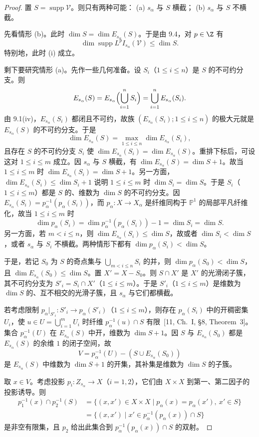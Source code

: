 \begin{proof}
置 $S=\operatorname{supp}\mathcal{V}$。则只有两种可能：
(a) $s_\alpha$ 与 $S$ 横截；
(b) $s_\alpha$ 与 $S$ 不横截。

先看情形 (b)。此时 $\dim S=\dim E_{s_\alpha}(S)$。于是由 9.4，对 $p\in\Z$ 有
$$\dim\operatorname{supp}L^pI_{s_\alpha}(\mathcal{V})\le\dim S.$$
特别地，此时 (i) 成立。

剩下要研究情形 (a)。先作一些几何准备。设 $S_i$（$1\le i\le n$）是 $S$ 的不可约分支。则
$$E_{s_\alpha}(S)=E_{s_\alpha}\Bigl(\bigcup_{i=1}^n S_i\Bigr)=\bigcup_{i=1}^n E_{s_\alpha}(S_i).$$
由 9.1(iv)，$E_{s_\alpha}(S_i)$ 都闭且不可约，故族 $(E_{s_\alpha}(S_i);1\le i\le n)$ 的极大元就是 $E_{s_\alpha}(S)$ 的不可约分支。于是
$$\dim E_{s_\alpha}(S)=\max_{1\le i\le n}\dim E_{s_\alpha}(S_i),$$
且存在 $S$ 的不可约分支 $S_i$ 使 $\dim E_{s_\alpha}(S_i)=\dim E_{s_\alpha}(S)$。重排下标后，可设这对 $1\le i\le m$ 成立。因 $s_\alpha$ 与 $S$ 横截，有 $\dim E_{s_\alpha}(S)=\dim S+1$。故当 $1\le i\le m$ 时 $\dim E_{s_\alpha}(S_i)=\dim S+1$。另一方面，$\dim E_{s_\alpha}(S_i)\le\dim S_i+1$ 说明 $1\le i\le m$ 时 $\dim S_i=\dim S$。于是 $S_i$（$1\le i\le m$）都是 $S$ 的、维数为 $\dim S$ 的不可约分支。因 $E_{s_\alpha}(S_i)=p_\alpha^{-1}(p_\alpha(S_i))$，而 $p_\alpha:X\to X_\alpha$ 是纤维同构于 $\mathbb{P}^1$ 的局部平凡纤维化，故当 $1\le i\le m$ 时
$$\dim p_\alpha(S_i)=\dim p_\alpha^{-1}(p_\alpha(S_i))-1=\dim S_i=\dim S.$$
另一方面，若 $m<i\le n$，则 $\dim E_{s_\alpha}(S_i)\le\dim S$，故或者 $\dim S_i<\dim S$，或者 $s_\alpha$ 与 $S_i$ 不横截。两种情形下都有 $\dim p_\alpha(S_i)<\dim S$。

于是，若记 $S_0$ 为 $S$ 的奇点集与 $\bigcup_{m<i\le n}S_i$ 的并，则 $\dim p_\alpha(S_0)<\dim S$，且 $\dim E_{s_\alpha}(S_0)\le\dim S$。置 $X'=X-S_0$。则 $S\cap X'$ 是 $X'$ 的光滑闭子簇，其不可约分支为 $S'_i=S_i\cap X'$（$1\le i\le m$）。于是 $S'_i$（$1\le i\le m$）是维数为 $\dim S$ 的、互不相交的光滑子簇，且 $s_\alpha$ 与它们都横截。

若考虑限制 $p_\alpha|_{S'_i}:S'_i\to p_\alpha(S'_i)$（$1\le i\le m$），则存在 $p_\alpha(S_i)$ 中的开稠密集 $U_i$，使 $u\in U=\bigcup_{i=1}^m U_i$ 时纤维 $p_\alpha^{-1}(u)\cap S$ 有限~[11, Ch.~I, \S8, Theorem~3]。集合 $p_\alpha^{-1}(U)$ 在 $E_{s_\alpha}(S)$ 中开，维数为 $\dim S+1$。因 $S$ 与 $E_{s_\alpha}(S_0)$ 都是 $E_{s_\alpha}(S)$ 的余维 $1$ 的闭子空间，故
$$V=p_\alpha^{-1}(U)-(S\cup E_{s_\alpha}(S_0))$$
是 $E_{s_\alpha}(S)$ 中维数为 $\dim S+1$ 的开集，其补集是维数为 $\dim S$ 的子簇。

取 $x\in V$。考虑投影 $p_i:Z_{s_\alpha}\to X$（$i=1,2$），它们由 $X\times X$ 到第一、第二因子的投影诱导。则
\begin{align*}
p_1^{-1}(x)\cap p_2^{-1}(S)&=\{(x,x')\in X\times X\mid p_\alpha(x)=p_\alpha(x'),\ x'\in S\}\\
&=\{(x,x')\mid x'\in p_\alpha^{-1}(p_\alpha(x))\cap S\}
\end{align*}
是非空有限集，且 $p_2$ 给出此集合到 $p_\alpha^{-1}(p_\alpha(x))\cap S$ 的双射。


\end{proof}

